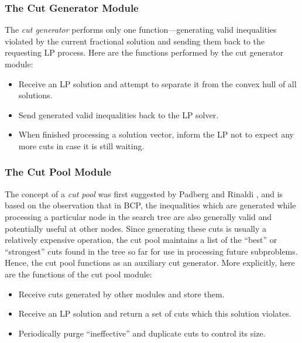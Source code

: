 \subsubsection{The Cut Generator Module}

The {\em cut generator} performs only one function---generating valid
inequalities violated by the current fractional solution and sending
them back to the requesting LP process. Here are the functions
performed by the cut generator module:
\begin{itemize}
        \item Receive an LP solution and attempt to
        separate it from the convex hull of all solutions.
        \item Send generated valid inequalities back to the LP solver.  
        \item When finished processing a solution vector, inform the
        LP not to expect any more cuts in case it is still waiting.
\end{itemize}

\subsubsection{The Cut Pool Module}

The concept of a {\em cut pool} was first suggested by Padberg and
Rinaldi \cite{padb:branc}, and is based on the observation that in BCP, the
inequalities which are generated while processing a particular node in
the search tree are also generally valid and potentially useful at
other nodes. Since generating these cuts is usually a relatively
expensive operation, the cut pool maintains a list of the ``best'' or
``strongest'' cuts found in the tree so far for use in processing
future subproblems. Hence, the cut pool functions as an auxiliary cut
generator. More explicitly, here are the functions of the cut pool
module:
\begin{itemize}
        \item Receive cuts generated by other modules and store them.
        \item Receive an LP solution and return a
set of cuts which this solution violates.
        \item Periodically purge ``ineffective'' and duplicate cuts
to control its size.
\end{itemize}

